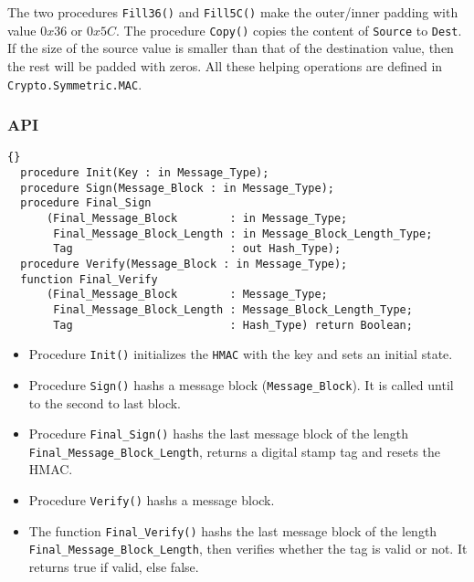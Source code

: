 The two procedures \texttt{Fill36()} and \texttt{Fill5C()} make the outer/inner padding with value $0x36$ or $0x5C$.
The procedure \texttt{Copy()} copies the content of \texttt{Source} to \texttt{Dest}. If the size of the source value is smaller than that of the destination value, then the rest will be padded with zeros.
All these helping operations are defined in \texttt{Crypto.Symmetric.MAC}.\\
\subsubsection*{API}
\begin{lstlisting}{}
  procedure Init(Key : in Message_Type);
  procedure Sign(Message_Block : in Message_Type);
  procedure Final_Sign
      (Final_Message_Block        : in Message_Type;
       Final_Message_Block_Length : in Message_Block_Length_Type;
       Tag                        : out Hash_Type);
  procedure Verify(Message_Block : in Message_Type);
  function Final_Verify
      (Final_Message_Block        : Message_Type;
       Final_Message_Block_Length : Message_Block_Length_Type;
       Tag                        : Hash_Type) return Boolean;
\end{lstlisting}
\begin{itemize}
\item Procedure \texttt{Init()} initializes the \texttt{HMAC} with the key and sets an initial state.
\item Procedure \texttt{Sign()} hashs a message block (\texttt{Message\_Block}). It is called until to the second to last block.
\item Procedure \texttt{Final\_Sign()} hashs the last message block of the length \texttt{Final\_Message\_B\-lock\_Length}, returns a digital stamp tag and resets the HMAC.
\item Procedure \texttt{Verify()} hashs a message block.
\item The function \texttt{Final\_Verify()} hashs the last message block of the length \texttt{Final\_Message\_B\-lock\_Length}, then verifies whether the tag is valid or not. It returns true if valid, else false.
\end{itemize}
